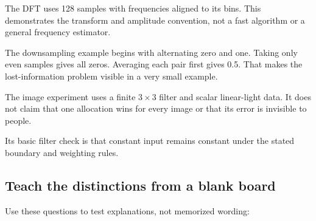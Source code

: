 The DFT uses 128 samples with frequencies aligned to its bins. This demonstrates the transform and amplitude convention, not a fast algorithm or a general frequency estimator.

The downsampling example begins with alternating zero and one. Taking only even samples gives all zeros. Averaging each pair first gives 0.5. That makes the lost-information problem visible in a very small example.

The image experiment uses a finite \(3\times3\) filter and scalar linear-light data. It does not claim that one allocation wins for every image or that its error is invisible to people.

Its basic filter check is that constant input remains constant under the stated boundary and weighting rules.

\subsection{Teach the distinctions from a blank board}\label{04-visual-computing-ii-ch042-teach-the-distinctions-from-a-blank-board}

\hypertarget{04-visual-computing-ii-ch042-teach-the-distinctions-from-a-blank-board}{}

Use these questions to test explanations, not memorized wording:

